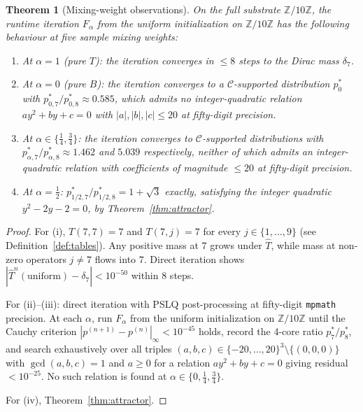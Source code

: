 \documentclass[11pt,reqno]{amsart}
\theoremstyle{plain}
\newtheorem{theorem}{Theorem}
\theoremstyle{definition}
\theoremstyle{remark}
\newcommand{\Z}{\mathbb{Z}}
\newcommand{\Zten}{\Z/10\Z}
\newcommand{\Cfour}{\mathcal{C}}
\newcommand{\Tfuse}{\widehat{T}}
\newcommand{\Fmix}{F_{\alpha}}
\begin{document}
\begin{theorem}[Mixing-weight observations]\label{thm:alpha}
On the full substrate $\Zten$, the runtime iteration $\Fmix$ from
the uniform initialization on $\Zten$ has the following behaviour
at five sample mixing weights:
\begin{enumerate}\setlength\itemsep{0pt}
\item[(i)] At $\alpha=1$ (pure $T$): the iteration converges in
$\leq 8$ steps to the Dirac mass $\delta_{7}$.
\item[(ii)] At $\alpha=0$ (pure $B$): the iteration converges to a
$\Cfour$-supported distribution $p^{*}_{0}$ with
$p^{*}_{0,7}/p^{*}_{0,8}\approx 0.585$, which admits no
integer-quadratic relation $ay^{2}+by+c=0$ with
$|a|,|b|,|c|\leq 20$ at fifty-digit precision.
\item[(iii)] At $\alpha\in\{\tfrac14,\tfrac34\}$: the iteration
converges to $\Cfour$-supported distributions with
$p^{*}_{\alpha,7}/p^{*}_{\alpha,8}\approx 1.462$ and $5.039$
respectively, neither of which admits an integer-quadratic
relation with coefficients of magnitude $\leq 20$ at fifty-digit
precision.
\item[(iv)] At $\alpha=\tfrac12$:
$p^{*}_{1/2,7}/p^{*}_{1/2,8}=1+\sqrt{3}$ exactly, satisfying the
integer quadratic $y^{2}-2y-2=0$, by Theorem~\ref{thm:attractor}.
\end{enumerate}
\end{theorem}

\begin{proof}
For (i), $T(7,7)=7$ and $T(7,j)=7$ for every $j\in\{1,\dots,9\}$
(see Definition~\ref{def:tables}). Any positive mass at $7$ grows
under $\Tfuse$, while mass at non-zero operators $j\neq 7$ flows
into $7$. Direct iteration shows
$|\Tfuse^{n}(\mathrm{uniform})-\delta_{7}|<10^{-50}$ within $8$
steps.

For (ii)–(iii): direct iteration with PSLQ post-processing at
fifty-digit \texttt{mpmath} precision. At each $\alpha$, run
$\Fmix$ from the uniform initialization on $\Zten$ until the
Cauchy criterion $|p^{(n+1)}-p^{(n)}|_{\infty}<10^{-45}$ holds,
record the 4-core ratio $p^{*}_{7}/p^{*}_{8}$, and search
exhaustively over all triples $(a,b,c)\in\{-20,\dots,20\}^{3}\setminus\{(0,0,0)\}$
with $\gcd(a,b,c)=1$ and $a\geq 0$ for a relation $ay^{2}+by+c=0$
giving residual $<10^{-25}$. No such relation is found at
$\alpha\in\{0,\tfrac14,\tfrac34\}$.

For (iv), Theorem~\ref{thm:attractor}.
\end{proof}
\end{document}
